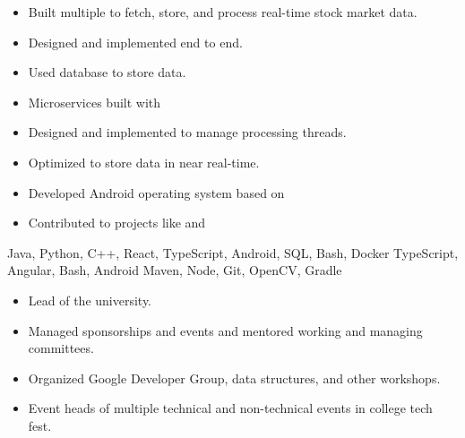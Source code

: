 \begin{itemize}
  \item Built multiple to fetch, store, and process real-time stock market data.
  \item Designed and implemented end to end.
  \item Used database to store data.
  \item Microservices built with 
  \item Designed and implemented to manage processing threads.
  \item Optimized to store data in near real-time.
 \end{itemize}

\begin{itemize}
  \item Developed Android operating system based on 
  \item Contributed to projects like and 
 \end{itemize}

Java, Python, C++, React, TypeScript, Android, SQL, Bash, Docker\newline
{}TypeScript, Angular, Bash, Android\newline
{}Maven, Node, Git, OpenCV, Gradle\newline

\begin{itemize}
    \item Lead of the university.
    \item Managed sponsorships and events and mentored working and managing committees.
    \item Organized Google Developer Group, data structures, and other workshops.
 \end{itemize}
\begin{itemize}
    \item Event heads of multiple technical and non-technical events in college tech fest.
 \end{itemize}

